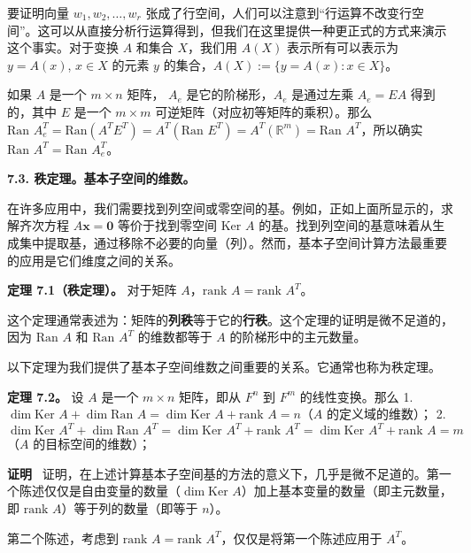要证明向量 $w_1, w_2, \dots, w_r$ 张成了行空间，人们可以注意到“行运算不改变行空间”。这可以从直接分析行运算得到，但我们在这里提供一种更正式的方式来演示这个事实。对于变换 $A$ 和集合 $X$，我们用 $A(X)$ 表示所有可以表示为 $y = A(x)$, $x \in X$ 的元素 $y$ 的集合，$A(X) := \{ y = A(x) : x \in X \}$。

如果 $A$ 是一个 $m \times n$ 矩阵， $A_e$ 是它的阶梯形，$A_e$ 是通过左乘 $A_e = EA$ 得到的，其中 $E$ 是一个 $m \times m$ 可逆矩阵（对应初等矩阵的乘积）。那么 $\text{Ran } A_e^T = \text{Ran}(A^T E^T) = A^T(\text{Ran } E^T) = A^T(\mathbb{R}^m) = \text{Ran } A^T$，所以确实 $\text{Ran } A^T = \text{Ran } A_e^T$。

\textbf{7.3. 秩定理。基本子空间的维数。}

在许多应用中，我们需要找到列空间或零空间的基。例如，正如上面所显示的，求解齐次方程 $A \mathbf{x} = \mathbf{0}$ 等价于找到零空间 $\text{Ker } A$ 的基。找到列空间的基意味着从生成集中提取基，通过移除不必要的向量（列）。然而，基本子空间计算方法最重要的应用是它们维度之间的关系。

\textbf{定理 7.1（秩定理）。} 对于矩阵 $A$，$\text{rank } A = \text{rank } A^T$。

这个定理通常表述为：矩阵的\textbf{列秩}等于它的\textbf{行秩}。这个定理的证明是微不足道的，因为 $\text{Ran } A$ 和 $\text{Ran } A^T$ 的维数都等于 $A$ 的阶梯形中的主元数量。

以下定理为我们提供了基本子空间维数之间重要的关系。它通常也称为秩定理。

\textbf{定理 7.2。} 设 $A$ 是一个 $m \times n$ 矩阵，即从 $F^n$ 到 $F^m$ 的线性变换。那么
1. $\dim \text{Ker } A + \dim \text{Ran } A = \dim \text{Ker } A + \text{rank } A = n$（$A$ 的定义域的维数）；
2. $\dim \text{Ker } A^T + \dim \text{Ran } A^T = \dim \text{Ker } A^T + \text{rank } A^T = \dim \text{Ker } A^T + \text{rank } A = m$（$A$ 的目标空间的维数）；

\textbf{证明}~ 证明，在上述计算基本子空间基的方法的意义下，几乎是微不足道的。第一个陈述仅仅是自由变量的数量（$\dim \text{Ker } A$）加上基本变量的数量（即主元数量，即 $\text{rank } A$）等于列的数量（即等于 $n$）。

第二个陈述，考虑到 $\text{rank } A = \text{rank } A^T$，仅仅是将第一个陈述应用于 $A^T$。

